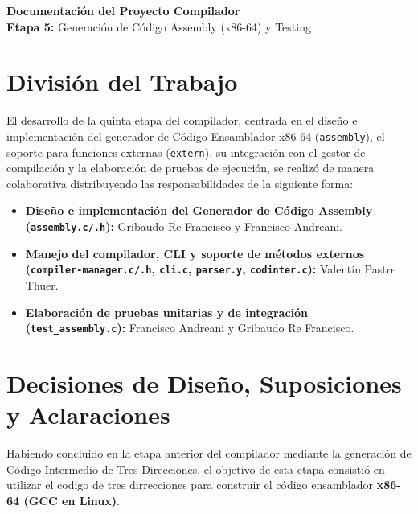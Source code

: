 \documentclass[12pt, a4paper]{article}
\begin{document}
\begin{center}
    {\LARGE \textbf{\textcolor{primary}{Documentación del Proyecto Compilador}}} \\
    \vspace{0.5cm}
    {\large \textbf{Etapa 5:} Generación de Código Assembly (x86-64) y Testing}
\end{center}
\vspace{0.8cm}

\section{División del Trabajo}
El desarrollo de la quinta etapa del compilador, centrada en el diseño e implementación del generador de Código Ensamblador x86-64 (\texttt{assembly}), el soporte para funciones externas (\texttt{extern}), su integración con el gestor de compilación y la elaboración de pruebas de ejecución, se realizó de manera colaborativa distribuyendo las responsabilidades de la siguiente forma:

\begin{itemize}
    \item \textbf{Diseño e implementación del Generador de Código Assembly (\texttt{assembly.c/.h}):} Gribaudo Re Francisco y Francisco Andreani.
    \item \textbf{Manejo del compilador, CLI y soporte de métodos externos (\texttt{compiler-manager.c/.h}, \texttt{cli.c}, \texttt{parser.y}, \texttt{codinter.c}):} Valentín Pastre Thuer.
    \item \textbf{Elaboración de pruebas unitarias y de integración (\texttt{test\_assembly.c}):} Francisco Andreani y Gribaudo Re Francisco.
\end{itemize}

\section{Decisiones de Diseño, Suposiciones y Aclaraciones}
Habiendo concluido en la etapa anterior del compilador mediante la generación de Código Intermedio de Tres Direcciones, el objetivo de esta etapa consistió en utilizar el codigo de tres dirrecciones para construir el código ensamblador \textbf{x86-64 (GCC en Linux)}.
\end{document}
